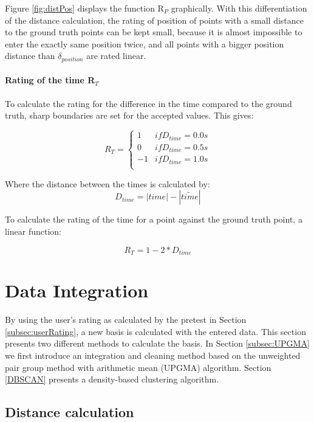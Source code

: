 Figure \ref{fig:distPos} displays the function R$_{P}$ graphically. With this differentiation of the distance calculation, the rating of position of points with a small distance to the ground truth points can be kept small, because it is almost impossible to enter the exactly same position twice, and all points with a bigger position distance than $\delta_{position}$ are rated linear.

\paragraph{Rating of the time R$_{T}$}

To calculate the rating for the difference in the time compared to the ground truth, sharp boundaries are set for the accepted values. This gives:

\begin{equation}
	R_{T} =
	\begin{cases}
		1	& if D_{time} = 0.0s \\
		0	& if D_{time} = 0.5s \\
		-1	& if D_{time} = 1.0s \\
   \end{cases}
\end{equation}

Where the distance between the times is calculated by:
 $$ D_{time} = |time| - |\widetilde{time}|$$

To calculate the rating of the time for a point against the ground truth point, a linear function:

\begin{equation}
	R_{T} = 1 - 2 * D_{time}
\end{equation}

\newpage


\section{Data Integration}

By using the user's rating as calculated by the pretest in Section \ref{subsec:userRating}, a new basis is calculated with the entered data.
This section presents two different methods to calculate the basis. In Section \ref{subsec:UPGMA} we first introduce an integration and cleaning method based on the unweighted pair group method with arithmetic mean (UPGMA) algorithm. Section \ref{DBSCAN} presents a density-based clustering algorithm.

\subsection{Distance calculation}\label{sec:Dist_calc}

